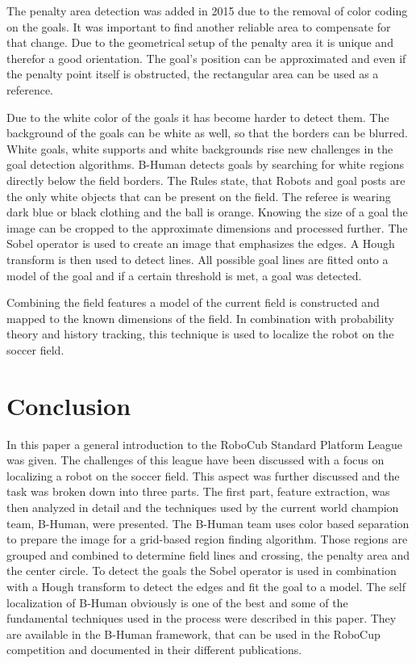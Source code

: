 \documentclass[12pt, a4paper, doc]{apa6}
\begin{document}
  The penalty area detection was added in 2015 due to the removal of color coding on the goals. It was important to find another reliable area to compensate for that change. Due to the geometrical setup of the penalty area it is unique and therefor a good orientation. The goal's position can be approximated and even if the penalty point itself is obstructed, the rectangular area can be used as a reference.

  Due to the white color of the goals it has become harder to detect them. The background of the goals can be white as well, so that the borders can be blurred. White goals, white supports and white backgrounds rise new challenges in the goal detection algorithms. B-Human detects goals by searching for white regions directly below the field borders. The Rules state, that Robots and goal posts are the only white objects that can be present on the field. The referee is wearing dark blue or black clothing and the ball is orange. Knowing the size of a goal the image can be cropped to the approximate dimensions and processed further. The Sobel operator is used to create an image that emphasizes the edges. A Hough transform is then used to detect lines. All possible goal lines are fitted onto a model of the goal and if a certain threshold is met, a goal was detected.

  Combining the field features a model of the current field is constructed and mapped to the known dimensions of the field. In combination with probability theory and history tracking, this technique is used to localize the robot on the soccer field.

  \section{Conclusion}
  In this paper a general introduction to the RoboCub Standard Platform League was given. The challenges of this league have been discussed with a focus on localizing a robot on the soccer field. This aspect was further discussed and the task was broken down into three parts. The first part, feature extraction, was then analyzed in detail and the techniques used by the current world champion team, B-Human, were presented. The B-Human team uses color based separation to prepare the image for a grid-based region finding algorithm. Those regions are grouped and combined to determine field lines and crossing, the penalty area and the center circle. To detect the goals the Sobel operator is used in combination with a Hough transform to detect the edges and fit the goal to a model.
  The self localization of B-Human obviously is one of the best and some of the fundamental techniques used in the process were described in this paper. They are available in the B-Human framework, that can be used in the RoboCup competition and documented in their different publications.
\end{document}
